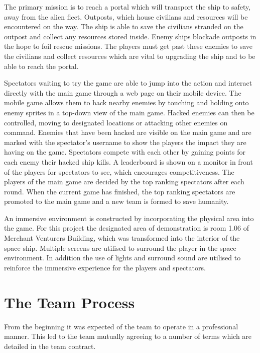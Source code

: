 \documentclass[a4paper,11pt]{article}
\begin{document}
The primary mission is to reach a portal which will transport the ship to safety, away from the alien fleet. Outposts, which house civilians and resources will be encountered on the way. The ship is able to save the civilians stranded on the outpost and collect any resources stored inside. Enemy ships blockade outposts in the hope to foil rescue missions. The players must get past these enemies to save the civilians and collect resources which are vital to upgrading the ship and to be able to reach the portal.

Spectators waiting to try the game are able to jump into the action and interact directly with the main game through a web page on their mobile device. The mobile game allows them to hack nearby enemies by touching and holding onto enemy sprites in a top-down view of the main game. Hacked enemies can then be controlled, moving to designated locations or attacking other enemies on command. Enemies that have been hacked are visible on the main game and are marked with the spectator’s username to show the players the impact they are having on the game. Spectators compete with each other by gaining points for each enemy their hacked ship kills. A leaderboard is shown on a monitor in front of the players for spectators to see, which encourages competitiveness. The players of the main game are decided by the top ranking spectators after each round. When the current game has finished, the top ranking spectators are promoted to the main game and a new team is formed to save humanity.

An immersive environment is constructed by incorporating the physical area into the game. For this project the designated area of demonstration is room 1.06 of Merchant Venturers Building, which was transformed into the interior of the space ship. Multiple screens are utilised to surround the player in the space environment. In addition the use of lights and surround sound are utilised to reinforce the immersive experience for the players and spectators. 


\clearpage

\section{The Team Process}

From the beginning it was expected of the team to operate in a professional manner. This led to the team mutually agreeing to a number of terms which are detailed in the team contract.
\end{document}
